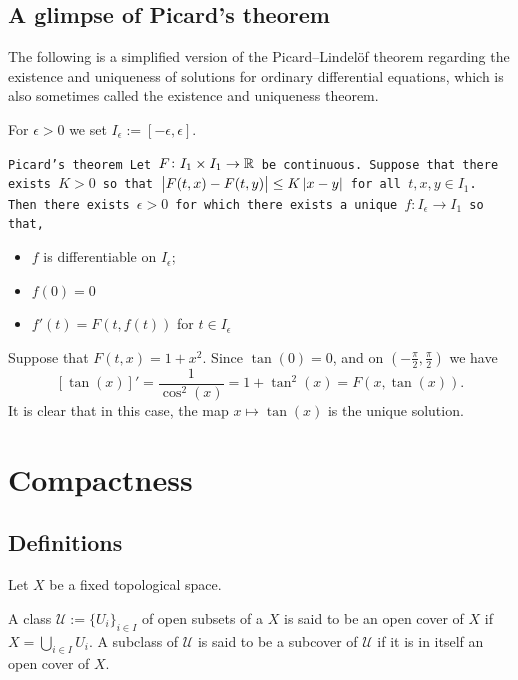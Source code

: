 \documentclass[11pt,a4paper]{article}
\begin{document}
\subsection{A glimpse of Picard’s theorem}

The following is a simplified version of the Picard–Lindelöf theorem 
regarding the existence and uniqueness of solutions for ordinary 
differential equations, which is also sometimes called the existence and 
uniqueness theorem.

For $\epsilon > 0$ we set $I_\epsilon := [-\epsilon, \epsilon]$.

\begin{theorem}
  \tt{Picard's theorem}
  Let $F \colon I_1 \times I_1 \to \mathbb{R}$ be continuous. Suppose that there 
  exists $K > 0$ so that $\left\lvert F(t,x) - F(t,y)\right\rvert \le K\left\lvert x - y\right\rvert$ for all 
  $t, x, y \in I_1$. Then there exists $\epsilon > 0$ for which there 
  exists a unique $f \colon I_{\epsilon} \to I_{1}$ so that,
  \begin{itemize}
    \item $f$ is differentiable on $I_{\epsilon}$;
    \item $f(0)=0$
    \item $f'(t) = F(t,f(t))$ for $t \in I_{\epsilon}$
  \end{itemize}
\end{theorem}
\begin{example}
  Suppose that $F(t,x) = 1 + x^2$. Since $\tan(0) = 0$, and on 
  $\left(- \frac{\pi}{2}, \frac{\pi}{2}\right)$ we have
  \[
    [\tan(x)]' = \frac{1}{\cos^2(x)} = 1 + \tan^2(x) = F(x,\tan(x)).
  \]
  It is clear that in this case, the map $x \mapsto \tan(x)$ is the unique
  solution.
\end{example}

\newpage

\section{Compactness}\label{sec:compactness}

\subsection{Definitions}

Let $X$ be a fixed topological space.
\begin{definition}
  A class $\mathcal{U} := \{U_i\}_{i \in I}$ of open subsets of a
  $X$ is said to be an open cover of $X$ if 
  $X = \bigcup_{i \in I} U_i$. A subclass of $\mathcal{U}$ is said
  to be a subcover of $\mathcal{U}$ if it is in itself an open cover
  of $X$.
\end{definition}
\end{document}
